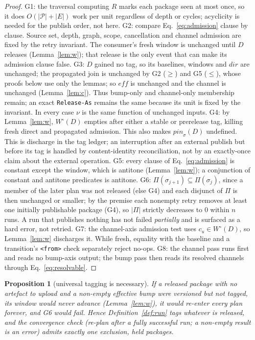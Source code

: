 \documentclass[10pt,conference]{IEEEtran}
\newtheorem{proposition}{Proposition}
\theoremstyle{definition}
\newcommand{\code}[1]{\texttt{#1}}
\newcommand{\G}[1]{G#1}
\begin{document}
\begin{proof}
\G{1}: the traversal computing $R$ marks each package seen at most
once, so it does $O(|\mathcal{P}|{+}|E|)$ work per unit regardless of
depth or cycles; acyclicity is needed for the publish order, not here.
\G{2}: compare Eq.~\ref{eq:admission} clause by clause. Source set,
depth, graph, scope, cancellation and channel admission are fixed by the
retry invariant. The consumer's fresh window is unchanged until $D$
releases (Lemma~\ref{lem:w}); that release is the only event that can
make its admission clause false.
\G{3}: $D$ gained no tag, so its baselines, windows and
$\mathit{dir}$ are unchanged; the propagated join is unchanged by \G{2}
($\geq$) and \G{5} ($\leq$), whose proofs below use only the lemmas; so
$\mathit{eff}$ is unchanged and the channel is unchanged
(Lemma~\ref{lem:c}). Thus bump-only and channel-only membership remain;
an exact \code{Release-As} remains the same because its unit is fixed by the
invariant. In every case $\nu$ is the same function of unchanged inputs.
\G{4}: by Lemma~\ref{lem:w}, $W^\circ(D)$ empties after either a stable
or prerelease tag, killing fresh direct and propagated admission. This
also makes $\mathit{pin}_\sigma(D)$ undefined. This is discharge in the tag
ledger; an interruption after an external publish
but before its tag is handled by content-identity reconciliation, not by
an exactly-once claim about the external operation.
\G{5}: every clause of Eq.~\ref{eq:admission} is constant except the
window, which is antitone (Lemma~\ref{lem:w}); a conjunction of
constant and antitone predicates is antitone.
\G{6}: $\Pi(\sigma_{j+1}) \subseteq \Pi(\sigma_j)$, since a member of
the later plan was not released (else \G{4}) and each disjunct of
$\Pi$ is then unchanged or smaller; by the premise each nonempty retry
removes at least one initially publishable package (\G{4}), so $|\Pi|$
strictly decreases to $0$ within
$n$ runs. A run that publishes nothing has not failed \emph{partially}
and is surfaced as a hard error, not retried.
\G{7}: the channel-axis admission test uses $c_u\in W^\circ(D)$, so
Lemma~\ref{lem:w} discharges it. While fresh, equality with the baseline
and a transition's \code{<from>} check separately reject no-ops.
\G{8}: the channel pass runs first and reads no bump-axis output; the bump
pass then reads its resolved channels through Eq.~\ref{eq:resolvable}.
\end{proof}

\begin{proposition}[universal tagging is necessary]
\label{prop:tagall}
If a released package with no artefact to upload and a non-empty effective
bump were versioned but not tagged, its window would never advance
(Lemma~\ref{lem:w}), it would re-enter every plan forever, and \G{6} would
fail. Hence
Definition~\ref{def:run} tags whatever is released, and the
convergence check (re-plan after a fully successful run; a non-empty
result is an error) admits exactly one exclusion, held packages.
\end{proposition}
\end{document}
